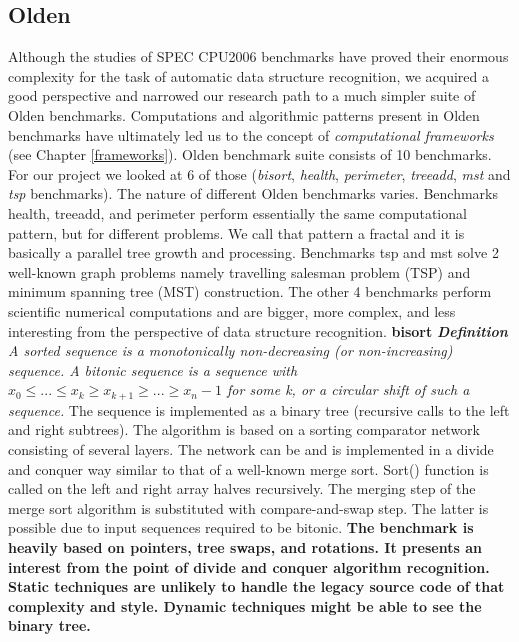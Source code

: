 \subsection{Olden}
\label{background_benchmarks_olden}
\quad Although the studies of SPEC CPU2006 benchmarks have proved their enormous complexity for the task of automatic data structure recognition, we acquired a good perspective and narrowed our research path to a much simpler suite of Olden benchmarks. Computations and algorithmic patterns present in Olden benchmarks have ultimately led us to the concept of \textit{computational frameworks} (see Chapter \ref{frameworks}).\newline\null
\quad Olden benchmark suite consists of 10 benchmarks. For our project we looked at 6 of those (\textit{bisort}, \textit{health}, \textit{perimeter}, \textit{treeadd}, \textit{mst} and \textit{tsp} benchmarks). The nature of different Olden benchmarks varies. Benchmarks health, treeadd, and perimeter perform essentially the same computational pattern, but for different problems. We call that pattern a fractal and it is basically a parallel tree growth and processing. Benchmarks tsp and mst solve 2 well-known graph problems namely travelling salesman problem (TSP) and minimum spanning tree (MST) construction. The other 4 benchmarks perform scientific numerical computations and are bigger, more complex, and less interesting from the perspective of data structure recognition.\newline\null
\quad \textbf{bisort} \quad \textit{\textbf{Definition} A sorted sequence is a monotonically non-decreasing (or non-increasing) sequence. A bitonic sequence is a sequence with $x_{0} \leq ... \leq x_{k} \geq x_{k+1} \geq ... \geq x_{n} - 1$ for some k, or a circular shift of such a sequence.}\newline\null
\quad The sequence is implemented as a binary tree (recursive calls to the left and right subtrees). The algorithm is based on a sorting comparator network consisting of several layers. The network can be and is implemented in a divide and conquer way similar to that of a well-known merge sort. Sort() function is called on the left and right array halves recursively. The merging step of the merge sort algorithm is substituted with compare-and-swap step. The latter is possible due to input sequences required to be bitonic.\newline\null
\quad\textbf{The benchmark is heavily based on pointers, tree swaps, and rotations. It presents an interest from the point of divide and conquer algorithm recognition. Static techniques are unlikely to handle the legacy source code of that complexity and style. Dynamic techniques might be able to see the binary tree.}\newline\null

